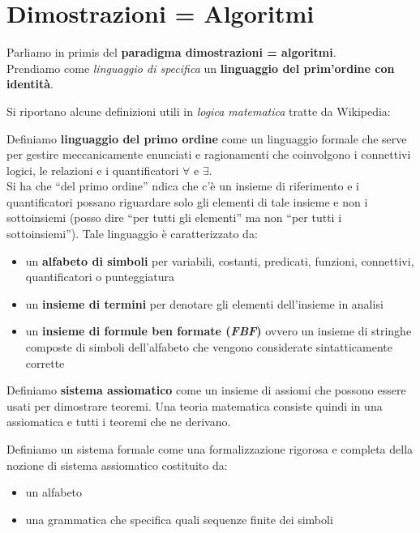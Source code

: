 \documentclass[a4paper,12pt, oneside]{book}
\begin{document}
\chapter{Dimostrazioni = Algoritmi}
Parliamo in primis del \textbf{paradigma dimostrazioni = algoritmi}.\\
Prendiamo come \textit{linguaggio di specifica} un \textbf{linguaggio
  del prim'ordine con identità}.
\begin{shaded}
  Si riportano alcune definizioni utili in \textit{logica matematica} tratte da
  Wikipedia: 
  \begin{definizione}
    Definiamo \textbf{linguaggio del primo ordine} come un linguaggio formale
    che serve per gestire meccanicamente enunciati e ragionamenti che
    coinvolgono i connettivi logici, le relazioni e i quantificatori $\forall$ e
    $\exists$.\\
    Si ha che ``del primo ordine'' ndica che c'è un insieme di riferimento e i
    quantificatori possano riguardare solo gli elementi di tale insieme e non i
    sottoinsiemi (posso dire ``per tutti gli elementi'' ma non ``per tutti i
    sottoinsiemi''). Tale linguaggio è caratterizzato da:
    \begin{itemize}
      \item un \textbf{alfabeto di simboli} per variabili, costanti, predicati,
      funzioni, connettivi, quantificatori o punteggiatura 
      \item un \textbf{insieme di termini} per denotare gli elementi
      dell'insieme in analisi
      \item un \textbf{insieme di formule ben formate (\textit{FBF})} ovvero un
      insieme di stringhe composte di simboli dell'alfabeto che vengono
      considerate sintatticamente corrette 
    \end{itemize}
  \end{definizione}
  \begin{definizione}
    Definiamo \textbf{sistema assiomatico} come un insieme di assiomi che
    possono essere usati per dimostrare teoremi. Una teoria matematica consiste
    quindi in una assiomatica e tutti i teoremi che ne derivano.  
  \end{definizione}
  \begin{definizione}
    Definiamo un sistema formale come una formalizzazione rigorosa e completa
    della nozione di sistema assiomatico costituito da:
    \begin{itemize}
      \item un alfabeto
      \item una grammatica che specifica quali sequenze finite dei simboli

\end{itemize}
\end{definizione}
\end{shaded}
\end{document}
